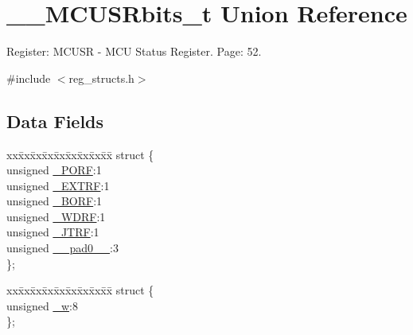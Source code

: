 \hypertarget{union_____m_c_u_s_rbits__t}{\section{\+\_\+\+\_\+\+M\+C\+U\+S\+Rbits\+\_\+t Union Reference}
\label{union_____m_c_u_s_rbits__t}
}


Register\+: M\+C\+U\+S\+R -\/ M\+C\+U Status Register. Page\+: 52.  




{\ttfamily \#include $<$reg\+\_\+structs.\+h$>$}

\subsection*{Data Fields}
\begin{DoxyCompactItemize}
\item 
\begin{tabbing}
xx\=xx\=xx\=xx\=xx\=xx\=xx\=xx\=xx\=\kill
struct \{\\
\>unsigned \hyperlink{union_____m_c_u_s_rbits__t_a042a9e354d253aef9cc29275bbac0013}{\_PORF}:1\\
\>unsigned \hyperlink{union_____m_c_u_s_rbits__t_abc22aba5b9f7852dbde1b1b8239c80f1}{\_EXTRF}:1\\
\>unsigned \hyperlink{union_____m_c_u_s_rbits__t_aa4487a42abfcea28d395b6e0b66738d4}{\_BORF}:1\\
\>unsigned \hyperlink{union_____m_c_u_s_rbits__t_a4f4d5a16d2b3b9ed0c3c940f70bace1b}{\_WDRF}:1\\
\>unsigned \hyperlink{union_____m_c_u_s_rbits__t_a71034b0bea0cb3264ee499688aa745d8}{\_JTRF}:1\\
\>unsigned \hyperlink{union_____m_c_u_s_rbits__t_a24672c1bbffdf8d6b9ce3ab66a7b375e}{\_\_pad0\_\_}:3\\
\}; \\

\end{tabbing}\item 
\begin{tabbing}
xx\=xx\=xx\=xx\=xx\=xx\=xx\=xx\=xx\=\kill
struct \{\\
\>unsigned \hyperlink{union_____m_c_u_s_rbits__t_af63a441756a2853d48f314b369cb7695}{\_w}:8\\
\}; \\

\end{tabbing}\end{DoxyCompactItemize}



